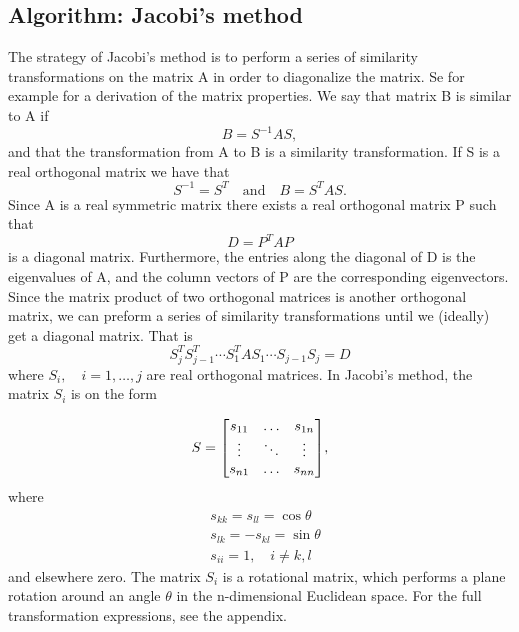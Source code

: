 \subsection{Algorithm: Jacobi's method}
\label{sec:jacobi}
The strategy of Jacobi's method is to perform a series of similarity transformations on the matrix A in order to diagonalize the matrix. Se for example \cite{linalg} for a derivation of the matrix properties. We say that matrix B is similar to A if
 \begin{equation}
	B = S^{-1}AS,
 \end{equation}
and that the transformation from A to B is a similarity transformation. If S is a real orthogonal matrix we have that
 \begin{equation}\label{eq:sim}
	 S^{-1}=S^T \quad \text{and} \quad B = S^TAS.
 \end{equation}
Since A is a real symmetric matrix there exists a real orthogonal matrix P such that
 \begin{equation}
     D=P^TAP
 \end{equation}
is a diagonal matrix. Furthermore, the entries along the diagonal of D is the eigenvalues of A, and the column vectors of P are the corresponding eigenvectors. Since the matrix product of two orthogonal matrices is another orthogonal matrix, we can preform a series of similarity transformations until we (ideally) get a diagonal matrix. That is
\begin{equation}
S_j^TS_{j-1}^T\cdots S_1^TAS_1 \cdots S_{j-1}S_j = D
\end{equation}
where $S_i, \quad i = 1, \ldots, j $ are real orthogonal matrices. In Jacobi's method, the matrix $S_i$ is on the form

\begin{equation}\label{eq:S}
S =
\mqty[s_{11} & \hdots & s_{1n} \\
\vdots & \ddots & \vdots \\
s_{n1} & \hdots & s_{nn} ],
\end{equation}
where
\begin{equation}
\begin{split}
&s_{kk}=s_{ll} = \cos \theta \\
&s_{lk} = -s_{kl} = \sin \theta \\
&s_{ii} =  1, \quad i \neq k,l
\end{split}
\end{equation}
and elsewhere zero. The matrix $S_i$ is a rotational matrix, which performs a plane rotation around an angle $\theta$ in the n-dimensional Euclidean space. For the full transformation expressions, see the appendix.

